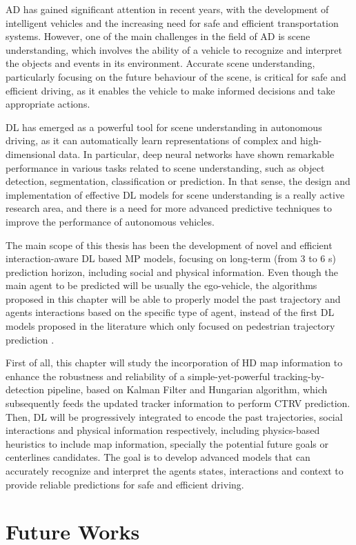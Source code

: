 \ac{AD} has gained significant attention in recent years, with the development of intelligent vehicles and the increasing need for safe and efficient transportation systems. However, one of the main challenges in the field of \ac{AD} is scene understanding, which involves the ability of a vehicle to recognize and interpret the objects and events in its environment. Accurate scene understanding, particularly focusing on the future behaviour of the scene, is critical for safe and efficient driving, as it enables the vehicle to make informed decisions and take appropriate actions.

\ac{DL} has emerged as a powerful tool for scene understanding in autonomous driving, as it can automatically learn representations of complex and high-dimensional data. In particular, deep neural networks have shown remarkable performance in various tasks related to scene understanding, such as object detection, segmentation, classification or prediction. In that sense, the design and implementation of effective \ac{DL} models for scene understanding is a really active research area, and there is a need for more advanced predictive techniques to improve the performance of autonomous vehicles.

The main scope of this thesis has been the development of novel and efficient interaction-aware \ac{DL} based \ac{MP} models, focusing on long-term (from 3 to 6 s) prediction horizon, including social and physical information. Even though the main agent to be predicted will be usually the ego-vehicle, the algorithms proposed in this chapter will be able to properly model the past trajectory and agents interactions based on the specific type of agent, instead of the first \ac{DL} models proposed in the literature which only focused on pedestrian trajectory prediction \cite{alahi2016social, gupta2018social, sadeghian2019sophie}. 

First of all, this chapter will study the incorporation of HD map information to enhance the robustness and reliability of a simple-yet-powerful tracking-by-detection pipeline, based on Kalman Filter and Hungarian algorithm, which subsequently feeds the updated tracker information to perform \ac{CTRV} prediction. Then, \ac{DL} will be progressively integrated to encode the past trajectories, social interactions and physical information respectively, including physics-based heuristics to include map information, specially the potential future goals or centerlines candidates. The goal is to develop advanced models that can accurately recognize and interpret the agents states, interactions and context to provide reliable predictions for safe and efficient driving. 

\section{Future Works}
\label{sec:6_future_works}

